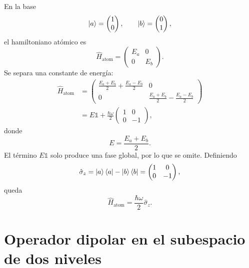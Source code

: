 \documentclass[11pt]{article}
\begin{document}
En la base
\begin{equation}
  \ket a=
  \begin{pmatrix}
    1\\0
  \end{pmatrix},
  \qquad
  \ket b=
  \begin{pmatrix}
    0\\1
  \end{pmatrix},
\end{equation}
el hamiltoniano at\'omico es
\begin{equation}
  \hat H_{\mathrm{atom}}
  =
  \begin{pmatrix}
    E_a & 0\\
    0 & E_b
  \end{pmatrix}.
\end{equation}
Se separa una constante de energ\'ia:
\begin{align}
  \hat H_{\mathrm{atom}}
  &=
  \begin{pmatrix}
    \frac{E_a+E_b}{2}+\frac{E_a-E_b}{2} & 0\\
    0 & \frac{E_a+E_b}{2}-\frac{E_a-E_b}{2}
  \end{pmatrix}                                                               \\
  &=
  E\mathbb{1}
  +
  \frac{\hbar\omega}{2}
  \begin{pmatrix}
    1&0\\
    0&-1
  \end{pmatrix},
\end{align}
donde
\begin{equation}
  E=\frac{E_a+E_b}{2}.
\end{equation}
El t\'ermino \(E\mathbb{1}\) solo produce una fase global, por lo que se omite.
Definiendo
\begin{equation}
  \hat\sigma_z
  =
  \ket a\bra a-\ket b\bra b
  =
  \begin{pmatrix}
    1&0\\
    0&-1
  \end{pmatrix},
\end{equation}
queda
\begin{equation}
  \boxed{
  \hat H_{\mathrm{atom}}
  =
  \frac{\hbar\omega}{2}\hat\sigma_z .
  }
\end{equation}

\section{Operador dipolar en el subespacio de dos niveles}
\end{document}
